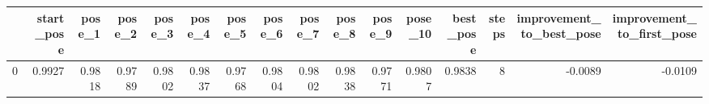 \begin{tabular}{lrrrrrrrrrrrrrrr}
\toprule
{} &  start\_pose &  pose\_1 &  pose\_2 &  pose\_3 &  pose\_4 &  pose\_5 &  pose\_6 &  pose\_7 &  pose\_8 &  pose\_9 &  pose\_10 &  best\_pose &  steps &  improvement\_to\_best\_pose &  improvement\_to\_first\_pose \\
\midrule
0 &      0.9927 &  0.9818 &  0.9789 &  0.9802 &  0.9837 &  0.9768 &  0.9804 &  0.9802 &  0.9838 &  0.9771 &   0.9807 &     0.9838 &      8 &                   -0.0089 &                    -0.0109 \\
\bottomrule
\end{tabular}

